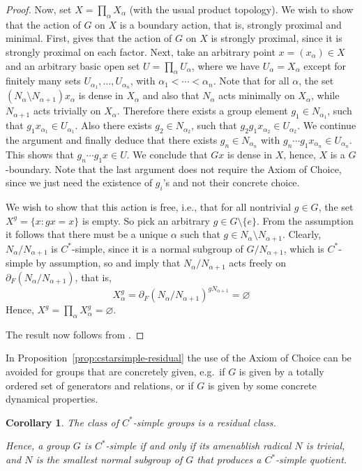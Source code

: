 \documentclass[a4paper]{amsart}
\theoremstyle{plain}
\newtheorem{corollary}[theorem]{Corollary}
\theoremstyle{definition}
\theoremstyle{remark}
\numberwithin{theorem}{section}
\begin{document}
\begin{proof}
Now, set $X=\prod_\alpha X_\alpha$ (with the usual product topology).
We wish to show that the action of $G$ on $X$ is a boundary action, that is, strongly proximal and minimal.
First, \cite[Lemma~3]{Ozawa} gives that the action of $G$ on $X$ is strongly proximal, since it is strongly proximal on each factor.
Next, take an arbitrary point $x=(x_\alpha)\in X$ and an arbitrary basic open set $U=\prod_\alpha U_\alpha$,
where we have $U_\alpha=X_\alpha$ except for finitely many sets $U_{\alpha_1},\dotsc,U_{\alpha_n}$,
with $\alpha_1 < \dotsb < \alpha_n$.
Note that for all $\alpha$,
the set $(N_\alpha\setminus N_{\alpha+1})x_\alpha$ is dense in $X_\alpha$ and also that $N_\alpha$ acts minimally on $X_\alpha$,
while $N_{\alpha+1}$ acts trivially on $X_\alpha$.
Therefore there exists a group element $g_1 \in N_{\alpha_1}$, such that $g_1 x_{\alpha_1} \in U_{\alpha_1}$.
Also there exists $g_2 \in N_{\alpha_2}$, such that $g_2 g_1 x_{\alpha_2} \in U_{\alpha_2}$.
We continue the argument and finally deduce that there exists $g_n \in N_{\alpha_n}$ with $g_n \cdots g_1 x_{\alpha_n} \in U_{\alpha_n}$. This shows that $g_n \cdots g_1 x \in U$.
We conclude that $Gx$ is dense in $X$,
hence, $X$ is a $G$-boundary.
Note that the last argument does not require the Axiom of Choice,
since we just need the existence of $g_i$'s and not their concrete choice.

We wish to show that this action is free, i.e., that for all nontrivial $g\in G$, the set $X^g=\{x : gx=x\}$ is empty.
So pick an arbitrary $g\in G\setminus\{e\}$.
From the assumption it follows that there must be a unique $\alpha$ such that $g\in N_\alpha\setminus N_{\alpha+1}$.
Clearly, $N_\alpha/N_{\alpha+1}$ is $C^*$-simple, since it is a normal subgroup of $G/N_{\alpha+1}$, which is $C^*$-simple by assumption,
so \cite[Theorem~6.2]{KK} and \cite[Lemma~3.3]{BKKO}
imply that $N_\alpha/N_{\alpha+1}$ acts freely on $\partial_F(N_\alpha/N_{\alpha+1})$,
that is,
\[
X_\alpha^g=\partial_F(N_\alpha/N_{\alpha+1})^{gN_{\alpha+1}}=\varnothing
\]
Hence, $X^g=\prod_\alpha X_\alpha^g=\varnothing$.

The result now follows from \cite[Theorem~6.2]{KK}.
\end{proof}

In Proposition~\ref{prop:cstarsimple-residual} the use of the Axiom of Choice can be avoided for groups that are concretely given,
e.g.\ if $G$ is given by a totally ordered set of generators and relations,
or if $G$ is given by some concrete dynamical properties.

\begin{corollary}
The class of $C^*$-simple groups is a residual class.

Hence, a group $G$ is $C^*$-simple if and only if its amenablish radical $N$ is trivial,
and $N$ is the smallest normal subgroup of $G$ that produces a $C^*$-simple quotient.
\end{corollary}
\end{document}
